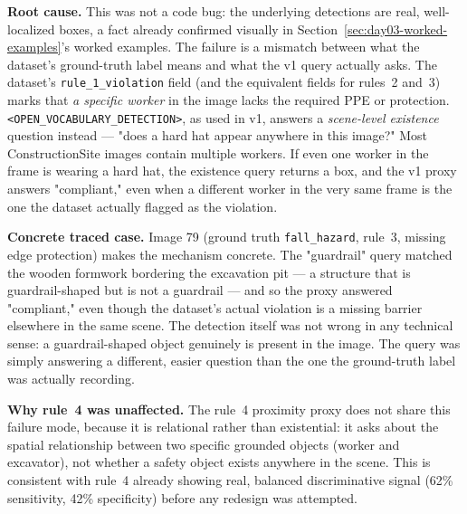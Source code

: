 \textbf{Root cause.} This was not a code bug: the underlying detections are real, well-localized
boxes, a fact already confirmed visually in Section~\ref{sec:day03-worked-examples}'s worked
examples. The failure is a mismatch between what the dataset's ground-truth label means and what
the v1 query actually asks. The dataset's \texttt{rule\_1\_violation} field (and the equivalent
fields for rules~2 and~3) marks that \emph{a specific worker} in the image lacks the required PPE
or protection. \texttt{<OPEN\_VOCABULARY\_DETECTION>}, as used in v1, answers a \emph{scene-level
existence} question instead --- "does a hard hat appear anywhere in this image?" Most
ConstructionSite images contain multiple workers. If even one worker in the frame is wearing a hard
hat, the existence query returns a box, and the v1 proxy answers "compliant," even when a different
worker in the very same frame is the one the dataset actually flagged as the violation.

\textbf{Concrete traced case.} Image 79 (ground truth \texttt{fall\_hazard}, rule~3, missing edge
protection) makes the mechanism concrete. The "guardrail" query matched the wooden formwork
bordering the excavation pit --- a structure that is guardrail-shaped but is not a guardrail ---
and so the proxy answered "compliant," even though the dataset's actual violation is a missing
barrier elsewhere in the same scene. The detection itself was not wrong in any technical sense: a
guardrail-shaped object genuinely is present in the image. The query was simply answering a
different, easier question than the one the ground-truth label was actually recording.

\textbf{Why rule~4 was unaffected.} The rule~4 proximity proxy does not share this failure mode,
because it is relational rather than existential: it asks about the spatial relationship between
two specific grounded objects (worker and excavator), not whether a safety object exists anywhere
in the scene. This is consistent with rule~4 already showing real, balanced discriminative signal
(62\% sensitivity, 42\% specificity) before any redesign was attempted.

